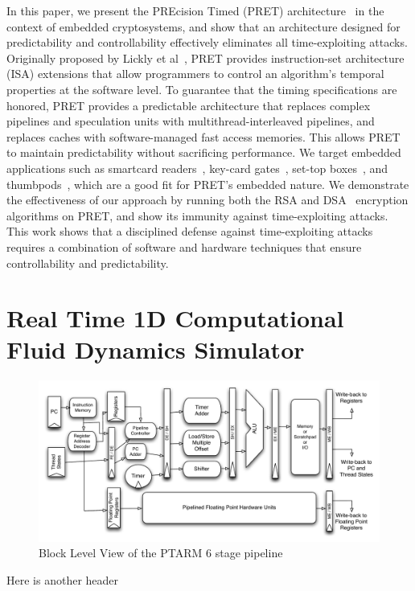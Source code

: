 In this paper, we present the PREcision Timed (PRET) architecture~\cite{pret_cases08} in the context of embedded cryptosystems, and show that an architecture designed for predictability and controllability effectively eliminates all time-exploiting attacks.
Originally proposed by Lickly et al~\cite{pret_cases08}, PRET provides instruction-set architecture (ISA) extensions that allow programmers to control an algorithm's temporal properties at the software level.
To guarantee that the timing specifications are honored, PRET provides a predictable architecture that replaces complex pipelines and speculation units with multithread-interleaved pipelines, and replaces caches with software-managed fast access memories.  
This allows PRET to maintain predictability without sacrificing performance.
We target embedded applications such as smartcard readers~\cite{99designprinciples}, key-card gates~\cite{rfidcrypto}, set-top boxes~\cite{99designprinciples}, and thumbpods~\cite{schaumont2003tts}, which are a good fit for PRET's embedded nature.
We demonstrate the effectiveness of our approach by running both the RSA and DSA~\cite{dss} encryption algorithms on PRET, and show its immunity against time-exploiting attacks.
This work shows that a disciplined defense against time-exploiting attacks requires a combination of software and hardware techniques that ensure controllability and predictability.


\section{Real Time 1D Computational Fluid Dynamics Simulator}
\label{sec:1dCFD}


\begin{figure}
  \vspace{-20pt}
  \begin{center}
    \includegraphics[scale=.6]{figs/ptarm_pipeline_six_stage}
  \end{center}
  \vspace{-20pt}
  \caption{Block Level View of the PTARM 6 stage pipeline}
  \label{fig:ptarm_pipeline_six_stage}
\end{figure}
Here is another header



